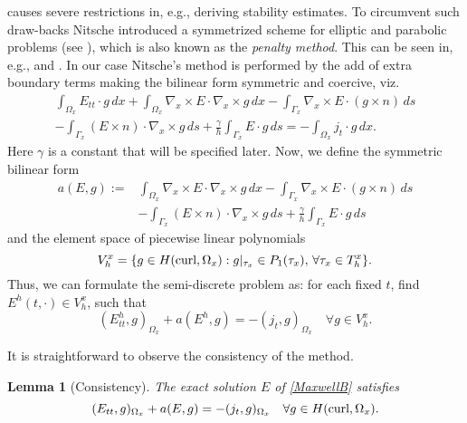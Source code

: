 \documentclass[reqno,a4paper]{amsart}
\newtheorem{lemma}[theorem]{Lemma}
\theoremstyle{remark}
\numberwithin{equation}{section}
\def\curl{\nabla_x \times }
\begin{document}
causes severe restrictions in, e.g., deriving stability estimates. 
To circumvent such draw-backs Nitsche introduced a symmetrized 
scheme for elliptic and parabolic problems (see \cite{Nitsche}), which is also known as 
the {\sl penalty method}. This can be seen in, e.g., \cite{Burman_Hansbo} and \cite{Sticko_Kreiss}. 
In our case Nitsche's method is performed 
by the add of extra boundary terms making the bilinear form
symmetric and coercive, viz. 
\begin{equation*}
\begin{aligned}
\int_{\Omega_x} E_{tt} \cdot g \, dx 
+ \int_{\Omega_x} \curl E \cdot \curl g \, dx
- \int_{\Gamma_x} \curl E \cdot (g \times n) \, ds \\
- \int_{\Gamma_x} (E \times n) \cdot \curl g \, ds 
+ \frac{\gamma}{h} \int_{\Gamma_x} E \cdot g \, ds
= -\int_{\Omega_x} j_t \cdot g \, dx.
\end{aligned}
\end{equation*}
Here $ \gamma $ is a constant that will be specified later.
Now, we define the symmetric bilinear form
\[
\begin{aligned}
a(E, g) :=& \int_{\Omega_x} \curl E \cdot \curl g \, dx- 
\int_{\Gamma_x} \curl E \cdot (g \times n) \, ds \\
&- \int_{\Gamma_x} (E \times n) \cdot \curl g \, ds 
+ \frac{\gamma}{h} \int_{\Gamma_x} E \cdot g \, ds
\end{aligned}
\]
and the element space of piecewise linear polynomials
\[
V^x_h=\{g\in H(\textnormal{curl}, \Omega_x): g|_{\tau_x} \in P_1(\tau_x ),
\, \forall \tau_x\in T^x_h\}.
\]
Thus, we can formulate the semi-discrete problem as: for each fixed $ t $,
find $ E^h (t, \cdot) \in V^x_h $, such that
\begin{equation} \label{NM2}
(E_{tt}^h, g)_{\Omega_x} + a(E^h, g) = 
-(j_t, g)_{\Omega_x} \quad \forall g \in V^x_h.
\end{equation}

It is straightforward to observe the consistency of the method.
\begin{lemma} [Consistency]\label{consisLemma}
The exact solution $E$ of \eqref{MaxwellB} satisfies
\[
(E_{tt}, g)_{\Omega_x} + a(E, g) = 
-(j_t, g)_{\Omega_x} \quad \forall g \in H(\textnormal{curl}, \Omega_x).
\]
\end{lemma}
\end{document}
